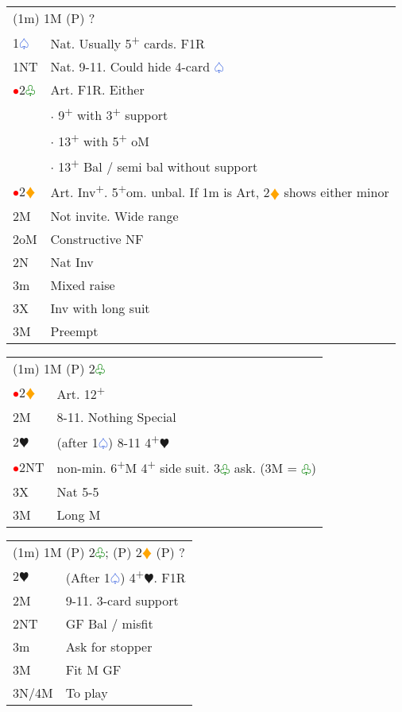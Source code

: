\documentclass{article}
\renewcommand{\sp}{\textcolor{RoyalBlue}{$\varspade$}}
\newcommand{\he}{\textcolor{RubineRed}{$\varheart$}}
\newcommand{\di}{\textcolor{Orange}{$\vardiamond$}}
\newcommand{\cl}{\textcolor{Green}{$\varclub$}}
\newcommand{\nt}{\relsize{-1}NT\relsize{1}}
\newcommand{\up}{\textsuperscript{+}}
\newcommand{\al}{\textcolor{red}{$\bullet$}}
\begin{document}
\medskip

\begin{tabular}{|l|p{6.5cm}}
	\multicolumn{2}{l}{(1m) 1M (P) ? } \\
	1\sp{} & Nat. Usually 5\up{} cards. F1R \\
	1\nt{} & Nat. 9-11. Could hide 4-card \sp{} \\
	\al{}2\cl{} & Art. F1R. Either \\
	&	$\cdot$ 9\up{} with 3\up{} support \\
	&	$\cdot$ 13\up{} with 5\up{} oM \\
	&	$\cdot$ 13\up{} Bal / semi bal without support \\
	\al{}2\di{} & Art. Inv\up{}. 5\up{}om. unbal. If 1m is Art, 2\di{} shows either minor \\
	2M & Not invite. Wide range \\
	2oM & Constructive NF \\
	2N & Nat Inv \\
	3m & Mixed raise \\
	3X & Inv with long suit \\
	3M & Preempt \\
\end{tabular}

\medskip

\begin{tabular}{|l|p{6.5cm}}
	\multicolumn{2}{l}{(1m) 1M (P) 2\cl{} } \\
	\al{}2\di{} & Art. 12\up{} \\
	2M & 8-11. Nothing Special \\
	2\he{} & (after 1\sp{}) 8-11 4\up{}\he{} \\
	\al{}2\nt{} & non-min. 6\up{}M 4\up{} side suit. 3\cl{} ask. (3M = \cl{}) \\
	3X & Nat 5-5 \\
	3M & Long M \\
\end{tabular}

\medskip

\begin{tabular}{|l|p{6.5cm}}
	\multicolumn{2}{l}{(1m) 1M (P) 2\cl{}; (P) 2\di{} (P) ? } \\
	2\he{} & (After 1\sp{}) 4\up{}\he{}. F1R \\
	2M & 9-11. 3-card support \\
	2\nt{} & GF Bal / misfit \\
	3m & Ask for stopper \\
	3M & Fit M GF \\
	3N/4M & To play \\
\end{tabular}
\end{document}
